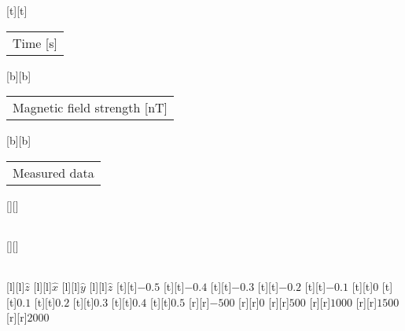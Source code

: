 %
[t][t]{\fontsize{8}{12}\selectfont \setlength{\tabcolsep}{0pt}\begin{tabular}{c}Time [s]\end{tabular}}%
[b][b]{\fontsize{8}{12}\selectfont \setlength{\tabcolsep}{0pt}\begin{tabular}{c}Magnetic field strength [nT]\end{tabular}}%
[b][b]{\fontsize{8}{12}\selectfont \setlength{\tabcolsep}{0pt}\begin{tabular}{c}Measured data\end{tabular}}%
[][]{\fontsize{8}{12}\selectfont \setlength{\tabcolsep}{0pt}\begin{tabular}{c} \end{tabular}}%
[][]{\fontsize{8}{12}\selectfont \setlength{\tabcolsep}{0pt}\begin{tabular}{c} \end{tabular}}%
[l][l]{\fontsize{6}{8}\selectfont $\hat{z}$}%
[l][l]{\fontsize{6}{8}\selectfont $\hat{x}$}%
[l][l]{\fontsize{6}{8}\selectfont $\hat{y}$}%
[l][l]{\fontsize{6}{8}\selectfont $\hat{z}$}%
%
\fontsize{6}{8}%
\selectfont%
%
[t][t]{$-0.5$}%
[t][t]{$-0.4$}%
[t][t]{$-0.3$}%
[t][t]{$-0.2$}%
[t][t]{$-0.1$}%
[t][t]{$0$}%
[t][t]{$0.1$}%
[t][t]{$0.2$}%
[t][t]{$0.3$}%
[t][t]{$0.4$}%
[t][t]{$0.5$}%
%
[r][r]{$-500$}%
[r][r]{$0$}%
[r][r]{$500$}%
[r][r]{$1000$}%
[r][r]{$1500$}%
[r][r]{$2000$}%
%
